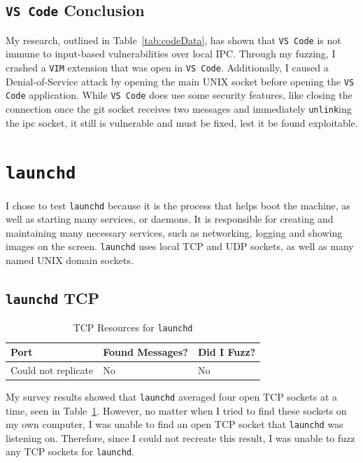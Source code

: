 \subsection{\texttt{VS Code} Conclusion}
\label{sec:codeConclusion}
My research, outlined in Table~\ref{tab:codeData}, has shown that \texttt{VS Code} is not immune to input-based vulnerabilities over local IPC.  Through my fuzzing, I crashed a \texttt{VIM} extension that was open in \texttt{VS Code}.  Additionally, I caused a Denial-of-Service attack by opening the main UNIX socket before opening the \texttt{VS Code} application.  While \texttt{VS Code} does use some security features, like closing the connection once the git socket receives two messages and immediately \texttt{unlink}ing the ipc socket, it still is vulnerable and must be fixed, lest it be found exploitable.

\section{\texttt{launchd}}
\label{sec:launchd}
I chose to test \texttt{launchd} because it is the process that helps boot the machine, as well as starting many services, or daemons.  It is responsible for creating and maintaining many necessary services, such as networking, logging and showing images on the screen.  \texttt{launchd} uses local TCP and UDP sockets, as well as many named UNIX domain sockets.

\subsection{\texttt{launchd} TCP}
\label{sec:launchdTcp}

\begin{table}
\centering
\begin{normalsize}
\begin{tabular}{ l | l | l }
\textbf{Port} & \textbf{Found Messages?} & \textbf{Did I Fuzz?} \\ \hline
Could not replicate & No & No \\ \hline
\end{tabular}
\caption{TCP Resources for \texttt{launchd}}
\label{tab:launchdTcpTab}
\end{normalsize}
\end{table} 

My survey results showed that \texttt{launchd} averaged four open TCP sockets at a time, seen in Table~\ref{tab:launchdTcpTab}.  However, no matter when I tried to find these sockets on my own computer, I was unable to find an open TCP socket that \texttt{launchd} was listening on.  Therefore, since I could not recreate this result, I was unable to fuzz any TCP sockets for \texttt{launchd}.

